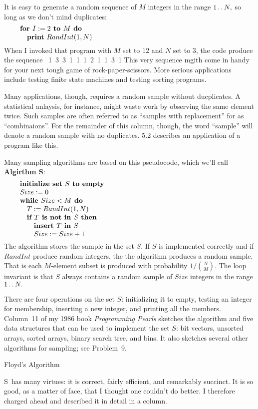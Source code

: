 It is easy to generate a random sequence of $M$ integers in the range
$1\mathinner{\ldotp\ldotp} N,$ so long as we don't mind duplicates:
$$\vbox{\let\par=\endgraf
\obeylines\sfcode`;=3000
{\bf for $I:=2$ to $M$ do}
\quad {\bf print} $RandInt(1,N)$
}$$
When I invoked that program with $M$ set to $12$ and $N$ set to $3$, the code
produce the sequence
\ 1\ 3\ 3\ 1\ 1\ 1\ 2\ 1\ 1\ 3\ 1
\enddisplay
This very sequence
mgith come in handy for your next tough game of rock-paper-scissors. More serious
applications include testing finite state machines and testing sorting programs.

Many applications, though, requires a random sample without ducplicates. A
statistical anlaysis, for instance, might waste work by observing the same
element twice. Such samples are often referred to as ``samples with replacement''
for as ``combinaions''. For the remainder of this column, though, the word
``sample'' will denote a random sample with no duplicates.
5.2 describes an application of a program like this.

Many sampling algorithms are based on this pseudocode, which we'll call
{\bf Algirthm S}:
$$\vbox{\let\par=\endgraf
\obeylines\sfcode`;=3000
{\bf initialize set $S$ to empty}
$Size := 0$
{\bf while $Size<M$ do}
\quad $T:=RandInt(1,N)$
\quad {\bf if $T$ is not in $S$ then}
\qquad {\bf insert $T$ in $S$}
\qquad $Size := Size + 1$
}$$
The algorithm stores the sample in the set $S$. If $S$ is implemented correctly
and if $RandInt$ produce random integers, the the algorithm produces a random
sample. That is each $M$-element subset is produced with probability $1/
{N\choose M}.$ The loop invariant is that $S$ always contains a random sample of
$Size$ integers in the range $1\mathinner{\ldotp\ldotp} N.$

There are four operations on the set $S$: initializing it to empty, testing an
integer for membership, inserting a new integer, and printing all the members.
Column~11 of my 1986 book {\sl Programming Pearls\/} sketches the algorithm and
five data structures that can be used to implement the set $S$: bit vectors,
unsorted arrays, sorted arrays, binary search tree, and bins. It also sketches
several other algorithms for sampling; see Problem~9.

 Floyd's Algorithm

\Alg S\ has many virtues: it is correct, fairly efficient, and remarkably
succinct. It is so good, as a matter of face, that I thought one couldn't do
better. I therefore charged ahead and described it in detail in a column.

